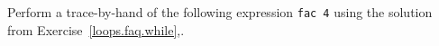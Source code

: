 Perform a trace-by-hand of the following expression \lstinline{fac 4} using the solution from Exercise~\ref{loops.faq.while},.
